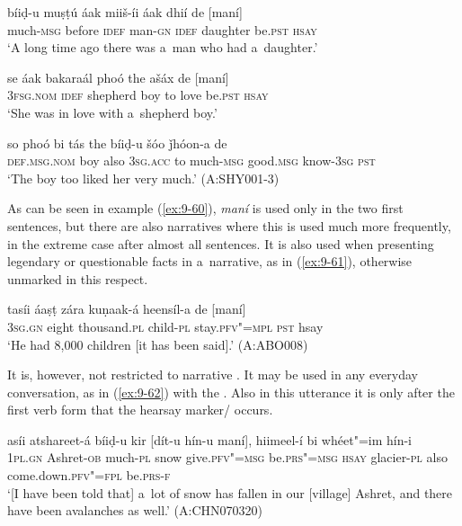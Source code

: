 \begin{exe}
\ex
\label{ex:9-60}
\gll \label{bkm:Ref190746425}bíiḍ-u muṣṭú áak miiš-íi áak dhií de [maní] \\
much-\textsc{msg} before \textsc{idef} man-\textsc{gn} \textsc{idef} daughter be.\textsc{pst}
\textsc{hsay} \\
\glt `A long time ago there was a~man who had a~daughter.' 

\gll se áak bakaraál phoó the ašáx de [maní] \\
\textsc{3fsg.nom} \textsc{idef} shepherd boy to love be.\textsc{pst} \textsc{hsay} \\
\glt `She was in love with a~shepherd boy.'

\gll so phoó bi tás the bíiḍ-u  šóo ǰhóon-a de \\
\textsc{def.msg.nom} boy also \textsc{3sg.acc} to much-\textsc{msg}  good.\textsc{msg} know-\textsc{3sg} \textsc{pst} \\
\glt `The boy too liked her very much.' (A:SHY001-3)
\end{exe}

As can be seen in example (\ref{ex:9-60}), \textit{maní} is used only in the two first sentences, but there are also narratives where this is used much more frequently, in the extreme case after almost all sentences. It is also used when presenting legendary or questionable facts in a~narrative, as in (\ref{ex:9-61}), otherwise unmarked in this respect.

\begin{exe}
\ex
\label{ex:9-61}
\gll tasíi áaṣṭ zára kuṇaak-á heensíl-a de [maní] \\
3\textsc{sg.gn} eight thousand.\textsc{pl} child-\textsc{pl} stay.\textsc{pfv"=mpl} \textsc{pst} hsay \\
\glt `He had 8,000 children [it has been said].' (A:ABO008)
\end{exe}

It is, however, not restricted to narrative . It may be used in any everyday conversation, as in (\ref{ex:9-62}) with the . Also in this utterance it is only after the first  verb form that the hearsay marker/ occurs.

\begin{exe}
\ex
\label{ex:9-62}
\gll asíi atshareet-á bíiḍ-u kir [dít-u hín-u maní], hiimeel-í bi whéet"=im hín-i \\
\textsc{1pl.gn} Ashret-\textsc{ob} much-\textsc{pl} snow give.\textsc{pfv"=msg} be.\textsc{prs"=msg} \textsc{hsay} glacier-\textsc{pl} also come.down.\textsc{pfv"=fpl} be.\textsc{prs-f} \\
\glt `[I have been told that] a~lot of snow has fallen in our [village] Ashret, and there have been avalanches as well.' (A:CHN070320)
\end{exe}

